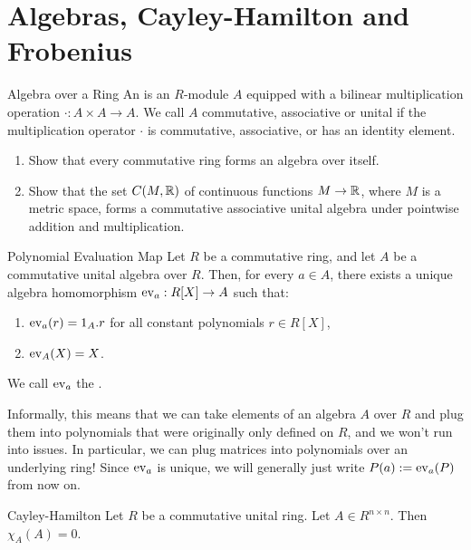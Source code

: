 \section{Algebras, Cayley-Hamilton and Frobenius}
\begin{importantdefinition}{Algebra over a Ring}{}
	An  is an $R$-module $A$ equipped with a bilinear multiplication operation $\cdot : A \times A \to A$. We call $A$ commutative, associative or unital if the multiplication operator $\cdot$ is commutative, associative, or has an identity element.
\end{importantdefinition}
\begin{exercise}
	\phantom{}
	\label{ex:realfunctionalgebra}
	\begin{enumerate}
		\item Show that every commutative ring forms an algebra over itself.
		\item Show that the set $C(M, \mathbb{R})$ of continuous functions $M \to \mathbb{R}$, where $M$ is a metric space, forms a commutative associative unital algebra under pointwise addition and multiplication.
	\end{enumerate}
\end{exercise}
\begin{importanttheorem}{Polynomial Evaluation Map}{}
	Let $R$ be a commutative ring, and let $A$ be a commutative unital algebra over $R$. Then, for every $a \in A$, there exists a unique algebra homomorphism $\operatorname{ev}_a : R[X] \to A$ such that:
	\begin{enumerate}
		\item $\operatorname{ev}_a(r) = 1_A . r$ for all constant polynomials $r \in R[X]$,
		\item $\operatorname{ev}_A(X) = X$.
	\end{enumerate}
	We call $\operatorname{ev}_a$ the .
\end{importanttheorem}
Informally, this means that we can take elements of an algebra $A$ over $R$ and plug them into polynomials that were originally only defined on $R$, and we won't run into issues. In particular, we can plug matrices into polynomials over an underlying ring! Since $\operatorname{ev}_a$ is unique, we will generally just write $P(a) := \operatorname{ev}_a(P)$ from now on.
\begin{importanttheorem}{Cayley-Hamilton}{}
	Let $R$ be a commutative unital ring. Let $A \in R^{n \times n}$. Then $\chi_A(A) = 0$.
\end{importanttheorem}
